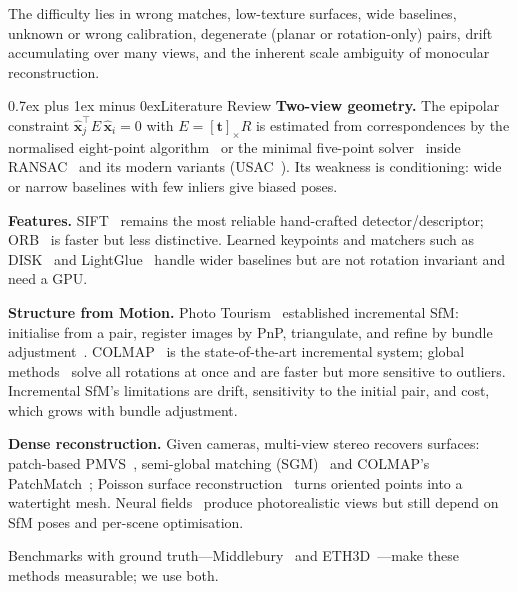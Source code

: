 \documentclass[conference,11pt]{IEEEtran}
\makeatletter
\def\section{\@startsection{section}{1}{\z@}{1.5ex plus 1.5ex minus 0.5ex}%
{0.7ex plus 1ex minus 0ex}{\normalfont\large\bfseries\centering\scshape}}
\makeatother
\begin{document}
The difficulty lies in wrong matches, low-texture surfaces, wide baselines, unknown or wrong calibration, degenerate (planar or rotation-only) pairs, drift accumulating over many views, and the inherent scale ambiguity of monocular reconstruction.

\section{Literature Review}
\textbf{Two-view geometry.} The epipolar constraint $\hat{\mathbf{x}}_j^\top E\,\hat{\mathbf{x}}_i = 0$ with $E=[\mathbf{t}]_\times R$ is estimated from correspondences by the normalised eight-point algorithm~\cite{hartley1997defense} or the minimal five-point solver~\cite{nister2004efficient} inside RANSAC~\cite{fischler1981random} and its modern variants (USAC~\cite{raguram2013usac}). Its weakness is conditioning: wide or narrow baselines with few inliers give biased poses.

\textbf{Features.} SIFT~\cite{lowe2004distinctive} remains the most reliable hand-crafted detector/descriptor; ORB~\cite{rublee2011orb} is faster but less distinctive. Learned keypoints and matchers such as DISK~\cite{tyszkiewicz2020disk} and LightGlue~\cite{lindenberger2023lightglue} handle wider baselines but are not rotation invariant and need a GPU.

\textbf{Structure from Motion.} Photo Tourism~\cite{snavely2006photo} established incremental SfM: initialise from a pair, register images by PnP, triangulate, and refine by bundle adjustment~\cite{triggs2000bundle}. COLMAP~\cite{schoenberger2016sfm} is the state-of-the-art incremental system; global methods~\cite{moulon2013global} solve all rotations at once and are faster but more sensitive to outliers. Incremental SfM's limitations are drift, sensitivity to the initial pair, and cost, which grows with bundle adjustment.

\textbf{Dense reconstruction.} Given cameras, multi-view stereo recovers surfaces: patch-based PMVS~\cite{furukawa2010accurate}, semi-global matching (SGM)~\cite{hirschmuller2008stereo} and COLMAP's PatchMatch~\cite{schoenberger2016pixelwise}; Poisson surface reconstruction~\cite{kazhdan2013screened} turns oriented points into a watertight mesh. Neural fields~\cite{mildenhall2020nerf,kerbl2023gaussian} produce photorealistic views but still depend on SfM poses and per-scene optimisation.

Benchmarks with ground truth---Middlebury~\cite{seitz2006comparison} and ETH3D~\cite{schops2017multi}---make these methods measurable; we use both.
\end{document}
